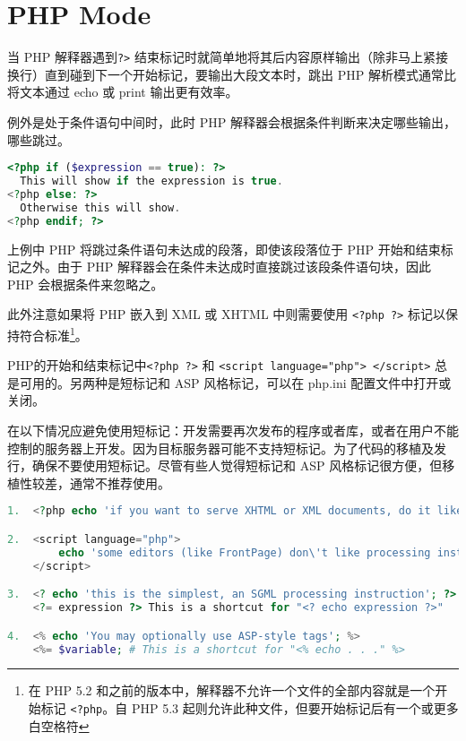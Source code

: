 \section{PHP Mode}

当 PHP 解释器遇到\texttt{?>} 结束标记时就简单地将其后内容原样输出（除非马上紧接换行）直到碰到下一个开始标记，要输出大段文本时，跳出 PHP 解析模式通常比将文本通过 echo 或 print 输出更有效率。

例外是处于条件语句中间时，此时 PHP 解释器会根据条件判断来决定哪些输出，哪些跳过。

\begin{lstlisting}[language=PHP]
<?php if ($expression == true): ?>
  This will show if the expression is true.
<?php else: ?>
  Otherwise this will show.
<?php endif; ?>
\end{lstlisting}

上例中 PHP 将跳过条件语句未达成的段落，即使该段落位于 PHP 开始和结束标记之外。由于 PHP 解释器会在条件未达成时直接跳过该段条件语句块，因此 PHP 会根据条件来忽略之。

此外注意如果将 PHP 嵌入到 XML 或 XHTML 中则需要使用 \texttt{<?php ?>} 标记以保持符合标准\footnote{在 PHP 5.2 和之前的版本中，解释器不允许一个文件的全部内容就是一个开始标记 \texttt{<?php}。自 PHP 5.3 起则允许此种文件，但要开始标记后有一个或更多白空格符}。

PHP的开始和结束标记中\texttt{<?php ?>} 和 \texttt{<script language="php"> </script>} 总是可用的。另两种是短标记和 ASP 风格标记，可以在 php.ini 配置文件中打开或关闭。

在以下情况应避免使用短标记：开发需要再次发布的程序或者库，或者在用户不能控制的服务器上开发。因为目标服务器可能不支持短标记。为了代码的移植及发行，确保不要使用短标记。尽管有些人觉得短标记和 ASP 风格标记很方便，但移植性较差，通常不推荐使用。

\begin{lstlisting}[language=PHP]
1.  <?php echo 'if you want to serve XHTML or XML documents, do it like this'; ?>

2.  <script language="php">
        echo 'some editors (like FrontPage) don\'t like processing instructions';
    </script>

3.  <? echo 'this is the simplest, an SGML processing instruction'; ?>
    <?= expression ?> This is a shortcut for "<? echo expression ?>"

4.  <% echo 'You may optionally use ASP-style tags'; %>
    <%= $variable; # This is a shortcut for "<% echo . . ." %>
\end{lstlisting}

